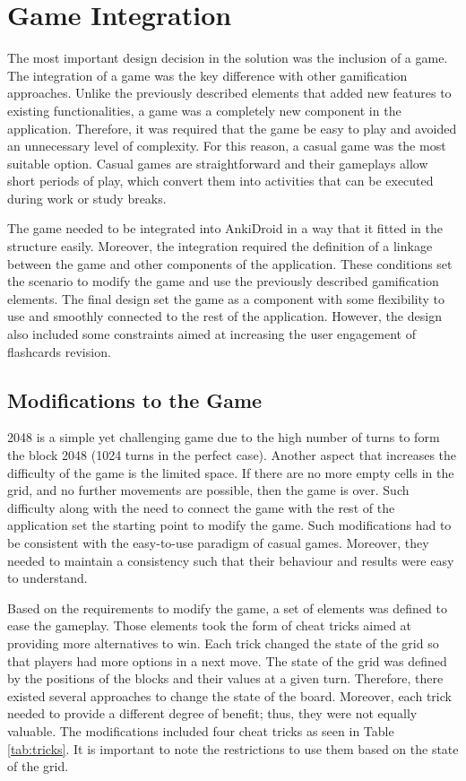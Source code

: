 \section{Game Integration}
\label{game-integration}
The most important design decision in the solution was the inclusion of a game. The integration of a game was the key difference with other gamification approaches. Unlike the previously described elements that added new features to existing functionalities, a game was a completely new component in the application. Therefore, it was required that the game be easy to play and avoided an unnecessary level of complexity. For this reason, a casual game was the most suitable option. Casual games are straightforward and their gameplays allow short periods of play, which convert them into activities that can be executed during work or study breaks.

The game needed to be integrated into AnkiDroid in a way that it fitted in the structure easily. Moreover, the integration required the definition of a linkage between the game and other components of the application. These conditions set the scenario to modify the game and use the previously described gamification elements. The final design set the game as a component with some flexibility to use and smoothly connected to the rest of the application. However, the design also included some constraints aimed at increasing the user engagement of flashcards revision.

\subsection{Modifications to the Game}
2048 is a simple yet challenging game due to the high number of turns to form the block 2048 (1024 turns in the perfect case). Another aspect that increases the difficulty of the game is the limited space. If there are no more empty cells in the grid, and no further movements are possible, then the game is over. Such difficulty along with the need to connect the game with the rest of the application set the starting point to modify the game. Such modifications had to be consistent with the easy-to-use paradigm of casual games. Moreover, they needed to maintain a consistency such that their behaviour and results were easy to understand.

Based on the requirements to modify the game, a set of elements was defined to ease the gameplay. Those elements took the form of cheat tricks aimed at providing more alternatives to win. Each trick changed the state of the grid so that players had more options in a next move. The state of the grid was defined by the positions of the blocks and their values at a given turn. Therefore, there existed several approaches to change the state of the board. Moreover, each trick needed to provide a different degree of benefit; thus, they were not equally valuable. The modifications included four cheat tricks as seen in Table \ref{tab:tricks}. It is important to note the restrictions to use them based on the state of the grid.

